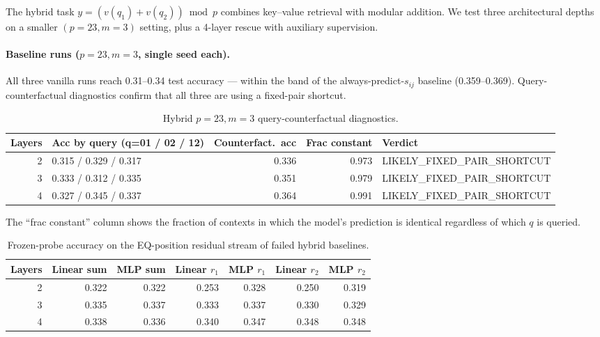 \documentclass{article}
\begin{document}
The hybrid task $y=(v(q_1)+v(q_2))\bmod p$ combines key--value retrieval with modular addition. We test three architectural depths on a smaller $(p=23, m=3)$ setting, plus a 4-layer rescue with auxiliary supervision.

\paragraph{Baseline runs ($p=23, m=3$, single seed each).}
All three vanilla runs reach 0.31--0.34 test accuracy --- within the band of the always-predict-$s_{ij}$ baseline (0.359--0.369). Query-counterfactual diagnostics confirm that all three are using a fixed-pair shortcut.

\begin{table}[h]
    \centering
    \caption{Hybrid $p=23, m=3$ query-counterfactual diagnostics.}
    \label{tab:hybrid-counter}
    \small
    \begin{tabular}{rlrrl}
        \toprule
        Layers & Acc by query (q=01 / 02 / 12) & Counterfact.\ acc & Frac constant & Verdict \\
        \midrule
        2 & 0.315 / 0.329 / 0.317 & 0.336 & 0.973 & \textsc{LIKELY\_FIXED\_PAIR\_SHORTCUT} \\
        3 & 0.333 / 0.312 / 0.335 & 0.351 & 0.979 & \textsc{LIKELY\_FIXED\_PAIR\_SHORTCUT} \\
        4 & 0.327 / 0.345 / 0.337 & 0.364 & 0.991 & \textsc{LIKELY\_FIXED\_PAIR\_SHORTCUT} \\
        \bottomrule
    \end{tabular}
\end{table}

The ``frac constant'' column shows the fraction of contexts in which the model's prediction is identical regardless of which $q$ is queried.

\begin{table}[h]
    \centering
    \caption{Frozen-probe accuracy on the EQ-position residual stream of failed hybrid baselines.}
    \label{tab:hybrid-probe}
    \small
    \begin{tabular}{rrrrrrr}
        \toprule
        Layers & Linear sum & MLP sum & Linear $r_1$ & MLP $r_1$ & Linear $r_2$ & MLP $r_2$ \\
        \midrule
        2 & 0.322 & 0.322 & 0.253 & 0.328 & 0.250 & 0.319 \\
        3 & 0.335 & 0.337 & 0.333 & 0.337 & 0.330 & 0.329 \\
        4 & 0.338 & 0.336 & 0.340 & 0.347 & 0.348 & 0.348 \\
        \bottomrule
    \end{tabular}
\end{table}
\end{document}
